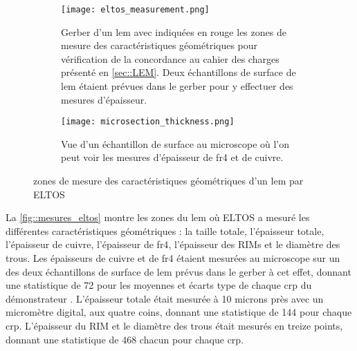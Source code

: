         \begin{figure}[htpb]
          \begin{subfigure}[t]{0.68\textwidth}
            \texttt{[image: eltos\_measurement.png]}
            \caption{Gerber d'un \gls{lem} avec indiquées en rouge les zones de mesure des caractéristiques géométriques pour vérification de la concordance au cahier des charges présenté en \autoref{sec::LEM}. Deux échantillons de surface de \gls{lem} étaient prévues dans le gerber pour y effectuer des mesures d'épaisseur.}
          \end{subfigure}
          \hfill
          \begin{subfigure}[t]{0.3\textwidth}
            \texttt{[image: microsection\_thickness.png]}
            \caption{\label{fig::microsection}Vue d'un échantillon de surface au microscope où l'on peut voir les mesures d'épaisseur de \gls{fr4} et de cuivre.}
          \end{subfigure}
          \caption[Zones de mesuredes caractéristiques géométriques d'un LEM par ELTOS]{\label{fig::mesures_eltos}zones de mesure des caractéristiques géométriques d'un \gls{lem} par ELTOS}
        \end{figure}
            
        La \autoref{fig::mesures_eltos} montre les zones du \gls{lem} où ELTOS a mesuré les différentes caractéristiques géométriques : la taille totale, l'épaisseur totale, l'épaisseur de cuivre, l'épaisseur de \gls{fr4}, l'épaisseur des RIMs et le diamètre des trous. Les épaisseurs de cuivre et de \gls{fr4} étaient mesurées au microscope sur un des deux échantillons de surface de \gls{lem} prévus dans le gerber à cet effet, donnant une statistique de 72 pour les moyennes et écarts type de chaque \gls{crp} du démonstrateur \SSS{}. L'épaisseur totale était mesurée à 10 microns près avec un micromètre digital, aux quatre coins, donnant une statistique de 144 pour chaque \gls{crp}. L'épaisseur du RIM et le diamètre des trous était mesurés en treize points, donnant une statistique de 468 chacun pour chaque \gls{crp}.
                
                
